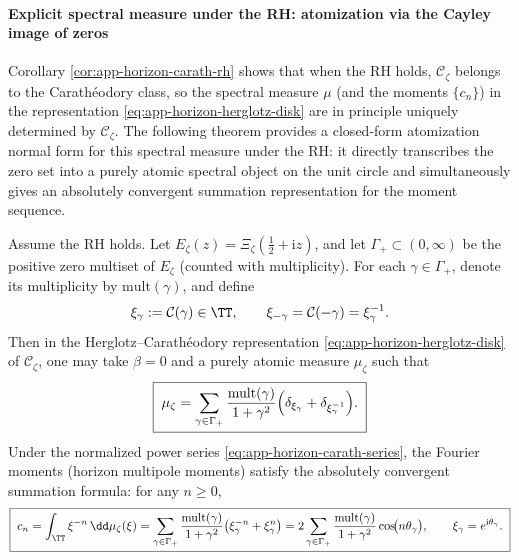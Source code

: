 \paragraph{Explicit spectral measure under the RH: atomization via the Cayley image of zeros}
Corollary \ref{cor:app-horizon-carath-rh} shows that when the RH holds, \(\mathscr{C}_{\zeta}\) belongs to the Carath\'eodory class, so the spectral measure \(\mu\) (and the moments \(\{c_n\}\)) in the representation \eqref{eq:app-horizon-herglotz-disk} are in principle uniquely determined by \(\mathscr{C}_{\zeta}\).
The following theorem provides a closed-form atomization normal form for this spectral measure under the RH: it directly transcribes the zero set into a purely atomic spectral object on the unit circle and simultaneously gives an absolutely convergent summation representation for the moment sequence.

\begin{theorem}\label{thm:app-horizon-spectral-measure-atomic}
Assume the RH holds.
Let \(E_{\zeta}(z)=\Xi_{\zeta}(\tfrac12+\mathrm{i}z)\), and let \(\Gamma_+\subset(0,\infty)\) be the positive zero multiset of \(E_{\zeta}\) (counted with multiplicity).
For each \(\gamma\in\Gamma_+\), denote its multiplicity by \(\mathrm{mult}(\gamma)\), and define
\[
\xi_{\gamma}:=\mathcal{C}(\gamma)\in\TT,
\qquad
\xi_{-\gamma}=\mathcal{C}(-\gamma)=\xi_{\gamma}^{-1}.
\]
Then in the Herglotz--Carath\'eodory representation \eqref{eq:app-horizon-herglotz-disk} of \(\mathscr{C}_{\zeta}\), one may take \(\beta=0\) and a purely atomic measure \(\mu_{\zeta}\) such that
\begin{equation}\label{eq:app-horizon-mu-atomic}
\boxed{\;
\mu_{\zeta}
=
\sum_{\gamma\in\Gamma_+}\frac{\mathrm{mult}(\gamma)}{1+\gamma^2}\Bigl(\delta_{\xi_{\gamma}}+\delta_{\xi_{\gamma}^{-1}}\Bigr).
\;}
\end{equation}
Under the normalized power series \eqref{eq:app-horizon-carath-series}, the Fourier moments (horizon multipole moments) satisfy the absolutely convergent summation formula: for any \(n\ge 0\),
\begin{equation}\label{eq:app-horizon-moment-sum}
\boxed{\;
c_n=\int_{\TT}\xi^{-n}\,\dd\mu_{\zeta}(\xi)
=
\sum_{\gamma\in\Gamma_+}\frac{\mathrm{mult}(\gamma)}{1+\gamma^2}\bigl(\xi_{\gamma}^{-n}+\xi_{\gamma}^{n}\bigr)
=
2\sum_{\gamma\in\Gamma_+}\frac{\mathrm{mult}(\gamma)}{1+\gamma^2}\cos\!\bigl(n\theta_{\gamma}\bigr),
\qquad \xi_{\gamma}=e^{\mathrm{i}\theta_{\gamma}}.
\;}
\end{equation}
\end{theorem}

